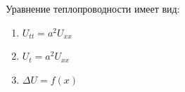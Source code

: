 Уравнение теплопроводности имеет вид:

\begin{enumerate}[label=\arabic*)]
    \item \(U_{tt}=a^2U_{xx}\)
    \item \(U_t=a^2U_{xx}\)
    \item \(\Delta U=f(x)\)
\end{enumerate}

